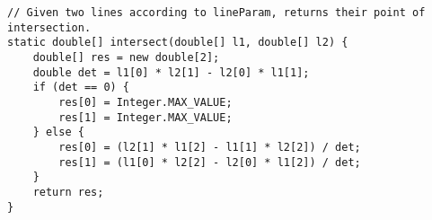 \begin{verbatim}
// Given two lines according to lineParam, returns their point of intersection.
static double[] intersect(double[] l1, double[] l2) {
	double[] res = new double[2];
	double det = l1[0] * l2[1] - l2[0] * l1[1];
	if (det == 0) {
		res[0] = Integer.MAX_VALUE;
		res[1] = Integer.MAX_VALUE;
	} else {
		res[0] = (l2[1] * l1[2] - l1[1] * l2[2]) / det;
		res[1] = (l1[0] * l2[2] - l2[0] * l1[2]) / det;
	}
	return res;
}
\end{verbatim}